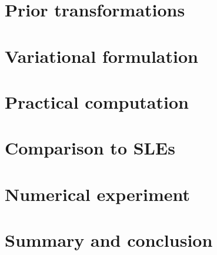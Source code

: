 \begin{refsection}


\section{Prior transformations} \label{sec:Transport:PriorTransformations}


\section{Variational formulation} \label{sec:Transport:VariationalFormulation}


\section{Practical computation} \label{sec:Transport:PracticalComputation}


\section{Comparison to SLEs} \label{sec:Transport:ComparisonToSLEs}


\section{Numerical experiment} \label{sec:Transport:NumericalExperiment}


\section{Summary and conclusion} \label{sec:Transport:SummaryConclusion}


\printbibliography[heading=subbibliography]
\end{refsection}